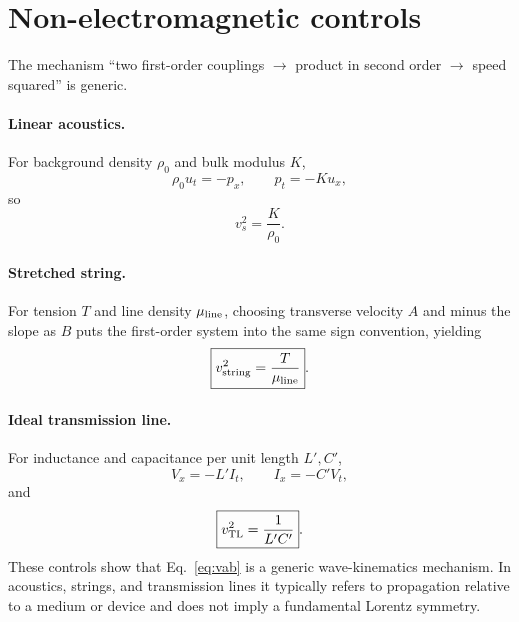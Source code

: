 \documentclass[11pt,a4paper]{article}
\begin{document}
\section{Non-electromagnetic controls}
The mechanism ``two first-order couplings $\to$ product in second order $\to$ speed squared'' is generic.

\paragraph{Linear acoustics.}
For background density $\rho_0$ and bulk modulus $K$,
\begin{equation}
\rho_0 u_t=-p_x,
\qquad
p_t=-K u_x,
\end{equation}
so
\begin{equation}
\boxed{v_s^2=\frac K{\rho_0}}.
\end{equation}

\paragraph{Stretched string.}
For tension $T$ and line density $\mu_{\rm line}$, choosing transverse velocity $A$ and minus the slope as $B$ puts the first-order system into the same sign convention, yielding
\begin{equation}
\boxed{v_{\rm string}^2=\frac T{\mu_{\rm line}}}.
\end{equation}

\paragraph{Ideal transmission line.}
For inductance and capacitance per unit length $L',C'$,
\begin{equation}
V_x=-L'I_t,
\qquad
I_x=-C'V_t,
\end{equation}
and
\begin{equation}
\boxed{v_{\rm TL}^2=\frac1{L'C'}}.
\end{equation}
These controls show that Eq.~\eqref{eq:vab} is a generic wave-kinematics mechanism. In acoustics, strings, and transmission lines it typically refers to propagation relative to a medium or device and does not imply a fundamental Lorentz symmetry.
\end{document}
